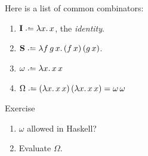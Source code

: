 \begin{frame}
  Here is a list of common combinators:
\begin{enumerate}
  \item $\mathbf{I} \defeq \lambda x.\, x$, the \emph{identity}.
  \item $\mathbf{S}\defeq\lambda f\,g\,x.\, 
    (f\,x)\,(g\,x)$.
  \item $\omega \defeq \lambda x.\, x\,x$
  \item $\Omega \defeq (\lambda x.\, x\,x)\,(\lambda x.\,x\,x)
    = \omega\,\omega$
\end{enumerate}
  \begin{block}{Exercise}
    \begin{enumerate}
      \item $\omega$ allowed in Haskell? 
      \item Evaluate $\Omega$. 
    \end{enumerate}
  \end{block}
\end{frame}

